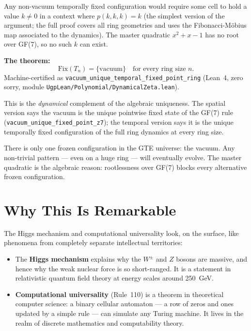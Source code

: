 \documentclass[11pt,a4paper]{article}
\newcommand{\lean}[1]{\texttt{#1}}
\begin{document}
Any non-vacuum temporally fixed configuration would require some cell to
hold a value $k \neq 0$ in a context where $p(k,k,k) = k$ (the simplest
version of the argument; the full proof covers all ring geometries and uses
the Fibonacci-M\"obius map associated to the dynamics).  The master
quadratic $x^2 + x - 1$ has no root over GF(7), so no such $k$ can exist.

\medskip
\noindent\textbf{The theorem:}
\[
  \mathrm{Fix}(T_n) = \{\text{vacuum}\} \quad \text{for every ring size } n.
\]
Machine-certified as \lean{vacuum\_unique\_temporal\_fixed\_point\_ring}
(Lean~4, zero sorry, module \lean{UgpLean/Polynomial/DynamicalZeta.lean}).

\medskip
This is the \emph{dynamical} complement of the algebraic uniqueness.
The spatial version says the vacuum is the unique pointwise fixed state of the
GF(7) rule (\lean{vacuum\_unique\_fixed\_point\_z7}); the temporal version says
it is the unique temporally fixed configuration of the full ring dynamics
at every ring size.

\begin{tcolorbox}[colback=boxblue,colframe=blue!40!black,title=Plain-English summary]
There is only one frozen configuration in the GTE universe: the vacuum.
Any non-trivial pattern — even on a huge ring — will eventually evolve.
The master quadratic is the algebraic reason: rootlessness over GF(7)
blocks every alternative frozen configuration.
\end{tcolorbox}

\section{Why This Is Remarkable}
\label{sec:remarkable}

The Higgs mechanism and computational universality look, on the surface,
like phenomena from completely separate intellectual territories:

\begin{itemize}[itemsep=4pt]
  \item The \textbf{Higgs mechanism} explains why the $W^\pm$ and $Z$ bosons
    are massive, and hence why the weak nuclear force is so short-ranged.
    It is a statement in relativistic quantum field theory at energy scales
    around 250~GeV.

  \item \textbf{Computational universality} (Rule~110) is a theorem in
    theoretical computer science: a binary cellular automaton — a row of
    zeros and ones updated by a simple rule — can simulate any Turing machine.
    It lives in the realm of discrete mathematics and computability theory.
\end{itemize}
\end{document}
